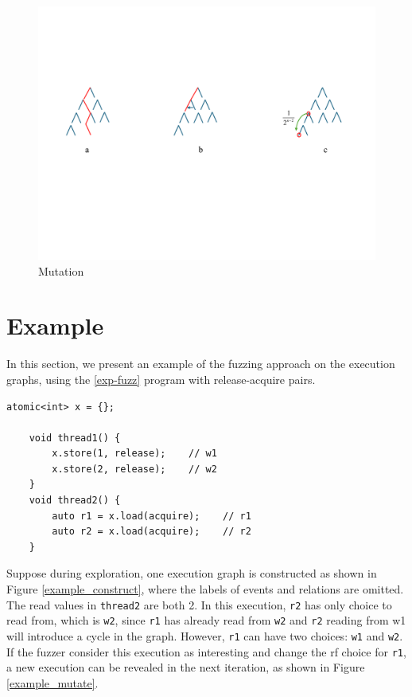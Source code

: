 \begin{figure}[htbp] %
    \centering
    \includegraphics[scale=0.5]{figure/tree3.pdf} %
    \caption{Mutation} %
    \label{tree3} %
\end{figure}



\section{Example}

In this section, we present an example of the fuzzing approach on the execution graphs, using the \ref{exp-fuzz} program with release-acquire pairs. 

\begin{lstlisting}[caption={Fuzzing example}, label={exp-fuzz}]
    atomic<int> x = {};
    
    void thread1() {
        x.store(1, release);    // w1
        x.store(2, release);    // w2
    }
    void thread2() {
        auto r1 = x.load(acquire);    // r1
        auto r2 = x.load(acquire);    // r2
    }
    \end{lstlisting}



Suppose during exploration, one execution graph is constructed as shown in Figure \ref{example_construct}, where the labels of events and relations are omitted. The read values in \texttt{thread2} are both 2. In this execution, \texttt{r2} has only choice to read from, which is \texttt{w2}, since \texttt{r1} has already read from \texttt{w2} and \texttt{r2} reading from w1 will introduce a cycle in the graph. However, \texttt{r1} can have two choices: \texttt{w1} and \texttt{w2}. If the fuzzer consider this execution as interesting and change the rf choice for \texttt{r1}, a new execution can be revealed in the next iteration, as shown in Figure \ref{example_mutate}. 

